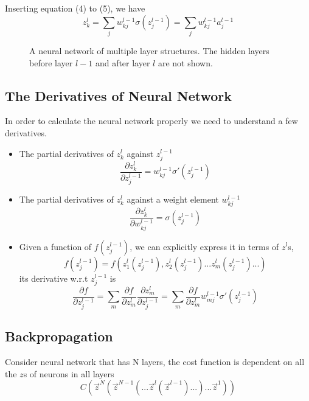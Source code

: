 \documentclass[12pt, oneside]{article}
\begin{document}
Inserting equation (4) to (5), we have 
\begin{equation}
z_k^l=\sum_jw^{l-1}_{kj}\sigma(z_j^{l-1})=\sum_jw^{l-1}_{kj}a_j^{l-1}
\end{equation}

\begin{center}
\begin{figure}

\caption{A neural network of multiple layer structures. The hidden layers before layer $l-1$ and after layer $l$ are not shown. }
\end{figure}
\end{center}


\subsection{The Derivatives of Neural Network}
In order to calculate the neural network properly we need to understand a few derivatives.

\begin{itemize}
\item The partial derivatives of $z^{l}_k$ against $z^{l-1}_j$
\begin{equation}
\frac{\partial z^{l}_k}{\partial z_j^{l-1}}=w^{l-1}_{kj}\sigma'(z^{l-1}_j)
\end{equation}

\item The partial derivatives of $z^{l}_k$ against a weight element $w_{kj}^{l-1}$
\begin{equation}
\frac{\partial z^{l}_k}{\partial w_{kj}^{l-1}}=\sigma(z^{l-1}_j)
\end{equation}

\item Given a function of $f(z^{l-1}_j)$, we can explicitly express it in terms of $z^{l}$s,
$$
f(z^{l-1}_j)=f(z^l_1(z^{l-1}_j), z^l_2(z^{l-1}_j)...z^l_m(z^{l-1}_j)...)
$$
its derivative w.r.t $z^{l-1}_j$ is
\begin{equation}
\frac{\partial f}{\partial z^{l-1}_j}=\sum\limits_m \frac{\partial f}{\partial z^{l}_m}\frac{\partial z^l_m}{\partial z^{l-1}_j}=\sum\limits_m \frac{\partial f}{\partial z^{l}_m}w^{l-1}_{mj}\sigma'(z^{l-1}_j)
\end{equation}

\end{itemize}



\subsection{Backpropagation}
Consider neural network that has N layers, the cost function is dependent on all the $z$s of neurons in all layers
\begin{equation}
C\left(\vec{z}^N(\vec{z}^{N-1}(...\vec{z}^{l}(\vec{z}^{l-1})...) ...\vec{z}^1)\right)
\end{equation}
\end{document}
